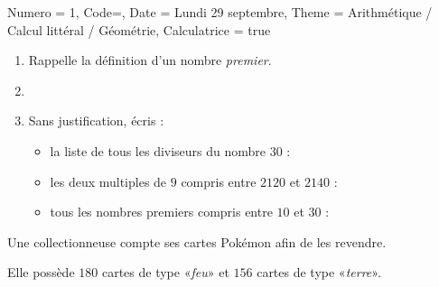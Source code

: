\documentclass[11pt]{article}
\newcommand{\ligne}{{\color{gray!60}\hrulefill}}
\begin{document}
\begin{Maquette}[IE]{
        Numero = 1, Code={}, Date = Lundi 29 septembre, Theme = Arithmétique / Calcul littéral / Géométrie, Calculatrice = true
    }


    \begin{exercice}
        \begin{enumerate}
            \item {} Rappelle la définition d’un nombre \emph{premier}. \ligne
            \item[] \ligne
            \item Sans justification, écris :
                  \begin{itemize}
                      \item {}la liste de tous les diviseurs du nombre $30$ : \ligne
                      \item {}les deux multiples de $9$ compris entre $2120$ et $2140$ : \ligne
                      \item {}tous les nombres premiers compris entre $10$ et $30$ : \ligne
                  \end{itemize}
        \end{enumerate}
    \end{exercice}

    \begin{exercice}
        Une collectionneuse compte ses cartes Pokémon afin de les revendre.

        Elle possède $180$ cartes de type «\emph{feu}» et $156$ cartes de type «\emph{terre}».


\end{exercice}
\end{Maquette}
\end{document}
